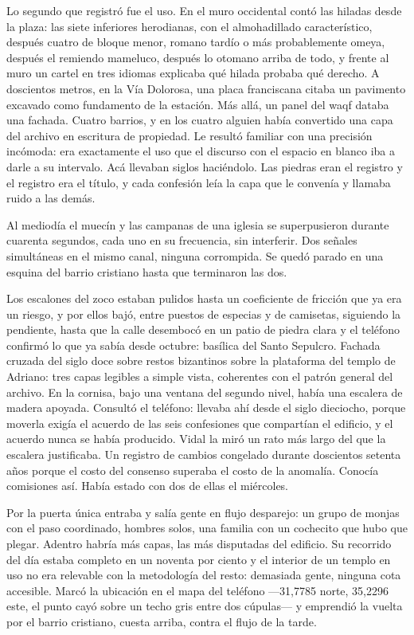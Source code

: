 Lo segundo que registró fue el uso. En el muro occidental contó las hiladas desde la plaza: las siete inferiores herodianas, con el almohadillado característico, después cuatro de bloque menor, romano tardío o más probablemente omeya, después el remiendo mameluco, después lo otomano arriba de todo, y frente al muro un cartel en tres idiomas explicaba qué hilada probaba qué derecho. A doscientos metros, en la Vía Dolorosa, una placa franciscana citaba un pavimento excavado como fundamento de la estación. Más allá, un panel del waqf databa una fachada. Cuatro barrios, y en los cuatro alguien había convertido una capa del archivo en escritura de propiedad. Le resultó familiar con una precisión incómoda: era exactamente el uso que el discurso con el espacio en blanco iba a darle a su intervalo. Acá llevaban siglos haciéndolo. Las piedras eran el registro y el registro era el título, y cada confesión leía la capa que le convenía y llamaba ruido a las demás.

Al mediodía el muecín y las campanas de una iglesia se superpusieron durante cuarenta segundos, cada uno en su frecuencia, sin interferir. Dos señales simultáneas en el mismo canal, ninguna corrompida. Se quedó parado en una esquina del barrio cristiano hasta que terminaron las dos.

Los escalones del zoco estaban pulidos hasta un coeficiente de fricción que ya era un riesgo, y por ellos bajó, entre puestos de especias y de camisetas, siguiendo la pendiente, hasta que la calle desembocó en un patio de piedra clara y el teléfono confirmó lo que ya sabía desde octubre: basílica del Santo Sepulcro. Fachada cruzada del siglo doce sobre restos bizantinos sobre la plataforma del templo de Adriano: tres capas legibles a simple vista, coherentes con el patrón general del archivo. En la cornisa, bajo una ventana del segundo nivel, había una escalera de madera apoyada. Consultó el teléfono: llevaba ahí desde el siglo dieciocho, porque moverla exigía el acuerdo de las seis confesiones que compartían el edificio, y el acuerdo nunca se había producido. Vidal la miró un rato más largo del que la escalera justificaba. Un registro de cambios congelado durante doscientos setenta años porque el costo del consenso superaba el costo de la anomalía. Conocía comisiones así. Había estado con dos de ellas el miércoles.

Por la puerta única entraba y salía gente en flujo desparejo: un grupo de monjas con el paso coordinado, hombres solos, una familia con un cochecito que hubo que plegar. Adentro habría más capas, las más disputadas del edificio. Su recorrido del día estaba completo en un noventa por ciento y el interior de un templo en uso no era relevable con la metodología del resto: demasiada gente, ninguna cota accesible. Marcó la ubicación en el mapa del teléfono ---31,7785 norte, 35,2296 este, el punto cayó sobre un techo gris entre dos cúpulas--- y emprendió la vuelta por el barrio cristiano, cuesta arriba, contra el flujo de la tarde.

